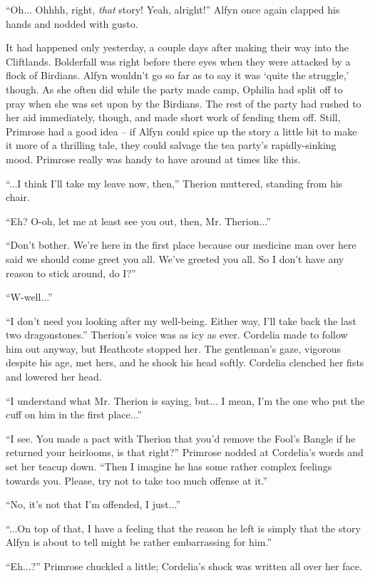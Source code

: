 ``Oh... Ohhhh, right, \emph{that} story! Yeah, alright!'' Alfyn once again clapped his hands and nodded with gusto.

It had happened only yesterday, a couple days after making their way into the Cliftlands. Bolderfall was right before there eyes when they were attacked by a flock of Birdians. Alfyn wouldn't go so far as to say it was `quite the struggle,' though. As she often did while the party made camp, Ophilia had split off to pray when she was set upon by the Birdians. The rest of the party had rushed to her aid immediately, though, and made short work of fending them off. Still, Primrose had a good idea -- if Alfyn could spice up the story a little bit to make it more of a thrilling tale, they could salvage the tea party's rapidly-sinking mood. Primrose really was handy to have around at times like this.

``...I think I'll take my leave now, then,'' Therion muttered, standing from his chair.

``Eh? O-oh, let me at least see you out, then, Mr. Therion...''

``Don't bother. We're here in the first place because our medicine man over here said we should come greet you all. We've greeted you all. So I don't have any reason to stick around, do I?''

``W-well...''

``I don't need you looking after my well-being. Either way, I'll take back the last two dragonstones.'' Therion's voice was as icy as ever. Cordelia made to follow him out anyway, but Heathcote stopped her. The gentleman's gaze, vigorous despite his age, met hers, and he shook his head softly. Cordelia clenched her fists and lowered her head. 

``I understand what Mr. Therion is saying, but... I mean, I'm the one who put the cuff on him in the first place...''

``I see. You made a pact with Therion that you'd remove the Fool's Bangle if he returned your heirlooms, is that right?'' Primrose nodded at Cordelia's words and set her teacup down. ``Then I imagine he has some rather complex feelings towards you. Please, try not to take too much offense at it.''

``No, it's not that I'm offended, I just...''

``...On top of that, I have a feeling that the reason he left is simply that the story Alfyn is about to tell might be rather embarrassing for him.''

``Eh...?'' Primrose chuckled a little; Cordelia's shock was written all over her face.

